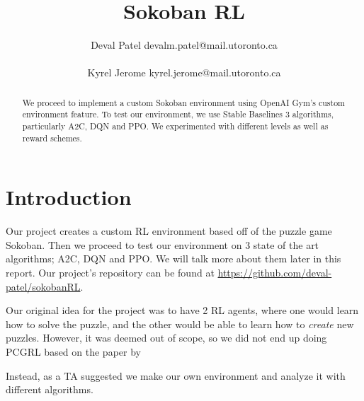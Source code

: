 \documentclass[twoside,11pt]{article}
\title{Sokoban RL}
\author{\name Deval Patel \email devalm.patel@mail.utoronto.ca \\
       \addr 1005468655\\
       \AND
      \name Kyrel Jerome \email kyrel.jerome@mail.utoronto.ca \\
       \addr 1004186169}
\begin{document}
\maketitle

\begin{abstract}%
We proceed to implement a custom Sokoban environment using OpenAI Gym's custom environment feature. To test our environment, we use Stable Baselines 3 algorithms, particularly A2C, DQN and PPO. We experimented with different levels as well as reward schemes.
\end{abstract}

\section{Introduction}
Our project creates a custom RL environment based off of the puzzle game Sokoban. Then we proceed to test our environment on 3 state of the art algorithms; A2C, DQN and PPO. We will talk more about them later in this report. Our project's repository can be found at \url{https://github.com/deval-patel/sokobanRL}.

Our original idea for the project was to have 2 RL agents, where one would learn how to solve the puzzle, and the other would be able to learn how to \textit{create} new puzzles. However, it was deemed out of scope, so we did not end up doing PCGRL based on the paper by \cite{khalifa2020pcgrl}

Instead, as a TA suggested we make our own environment and analyze it with different algorithms. 
\end{document}
